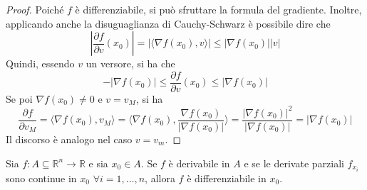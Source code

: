     \begin{proof}
        Poiché $f$ è differenziabile, si può sfruttare la formula del gradiente. Inoltre, applicando anche la disuguaglianza di Cauchy-Schwarz è possibile dire che
       \begin{equation*}
        \left|\frac{\partial f}{\partial v}(x_0)\right|= \left|\langle \nabla f(x_0), v\rangle\right| \leq \left|\nabla f(x_0)\right| \left|v\right|
       \end{equation*}
       Quindi, essendo $v$ un versore, si ha che 
       \begin{equation*}
        - \left|\nabla f(x_0)\right| \leq \frac{\partial f}{\partial v}(x_0) \leq \left|\nabla f(x_0)\right|
       \end{equation*}
       Se poi $\nabla f(x_0) \neq 0$ e $v=v_M$, si ha
       \begin{equation*}
        \frac{\partial f }{\partial v_M}= \langle \nabla f(x_0), v_M\rangle = \langle \nabla f(x_0), \frac{\nabla f (x_0)}{|\nabla f(x_0)|}\rangle=\frac{|\nabla f(x_0)|^2}{|\nabla f(x_0)|}=|\nabla f(x_0)|
       \end{equation*}
       Il discorso è analogo nel caso $v=v_m$.
    \end{proof}
\begin{theorem} \label{Teo: Differenziale totale}
    Sia $f:A \subseteq \mathbb{R}^n \to \mathbb{R}$ e sia $x_0 \in A$. Se $f$ è derivabile in $A$ e se le derivate parziali $f_{x_i}$ sono continue in $x_0$ $\forall i=1, \dots, n$, allora $f$ è differenziabile in $x_0$.
\end{theorem}
